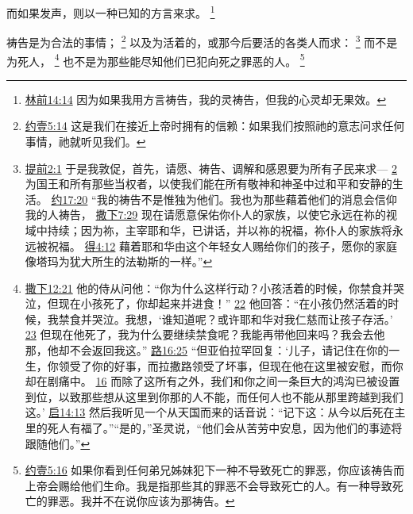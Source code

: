 \documentclass[12pt, a4paper, oneside]{ctexart}
\newcounter{parnum}[section]
\newcommand{\N}{%
   \noindent\refstepcounter{parnum}%
    \makebox[\parindent][l]{\textbf{\arabic{parnum}.}}}
\begin{document}
	而如果发声，则以一种已知的方言来求。
	\footnote {
		\href{https://biblehub.com/1_corinthians/14-14.htm}{林前14:14} 因为如果我用方言祷告，我的灵祷告，但我的心灵却无果效。
	}

\N 祷告是为合法的事情；
	\footnote {
		\href{https://biblehub.com/1_john/5-14.htm}{约壹5:14} 这是我们在接近上帝时拥有的信赖：如果我们按照祂的意志问求任何事情，祂就听见我们。
	}
	以及为活着的，或那今后要活的各类人而求：
	\footnote {
		\href{https://biblehub.com/1_timothy/2-1.htm}{提前2:1} 于是我敦促，首先，请愿、祷告、调解和感恩要为所有子民来求---
		\href{https://biblehub.com/1_timothy/2-2.htm}{2} 为国王和所有那些当权者，以使我们能在所有敬神和神圣中过和平和安静的生活。
		\href{https://biblehub.com/john/17-20.htm}{约17:20} “我的祷告不是惟独为他们。我也为那些藉着他们的消息会信仰我的人祷告，
		\href{https://biblehub.com/2_samuel/7-29.htm}{撒下7:29} 现在请愿意保佑你仆人的家族，以使它永远在祢的视域中持续；因为祢，主宰耶和华，已讲话，并以祢的祝福，祢仆人的家族将永远被祝福。
		\href{https://biblehub.com/ruth/4-12.htm}{得4:12} 藉着耶和华由这个年轻女人赐给你们的孩子，愿你的家庭像塔玛为犹大所生的法勒斯的一样。”
	}
	而不是为死人，
	\footnote {
		\href{https://biblehub.com/2_samuel/12-21.htm}{撒下12:21} 他的侍从问他：“你为什么这样行动？小孩活着的时候，你禁食并哭泣，但现在小孩死了，你却起来并进食！”
		\href{https://biblehub.com/2_samuel/12-22.htm}{22} 他回答：“在小孩仍然活着的时候，我禁食并哭泣。我想，‘谁知道呢？或许耶和华对我仁慈而让孩子存活。’
		\href{https://biblehub.com/2_samuel/12-23.htm}{23} 但现在他死了，我为什么要继续禁食呢？我能再带他回来吗？我会去他那，他却不会返回我这。”
		\href{https://biblehub.com/luke/16-25.htm}{路16:25} “但亚伯拉罕回复：‘儿子，请记住在你的一生，你领受了你的好事，而拉撒路领受了坏事，但现在他在这里被安慰，而你却在剧痛中。
		\href{https://biblehub.com/luke/16-26.htm}{16} 而除了这所有之外，我们和你之间一条巨大的鸿沟已被设置到位，以致那些想从这里到你那的人不能，而任何人也不能从那里跨越到我们这。’
		\href{https://biblehub.com/revelation/14-13.htm}{启14:13} 然后我听见一个从天国而来的话音说：“记下这：从今以后死在主里的死人有福了。”“是的，”圣灵说，“他们会从苦劳中安息，因为他们的事迹将跟随他们。”
	}
	也不是为那些能尽知他们已犯向死之罪恶的人。
	\footnote {
		\href{https://biblehub.com/1_john/5-16.htm}{约壹5:16} 如果你看到任何弟兄姊妹犯下一种不导致死亡的罪恶，你应该祷告而上帝会赐给他们生命。我是指那些其的罪恶不会导致死亡的人。有一种导致死亡的罪恶。我并不在说你应该为那祷告。
	}
\end{document}
